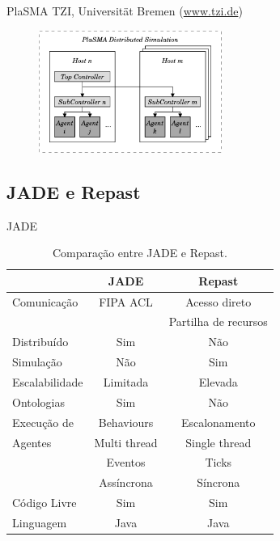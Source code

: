 \begin{frame}{PlaSMA}
	TZI, Universität Bremen (\url{www.tzi.de})

	\begin{figure}
		\centering
		\includegraphics[height=4cm]{figures/PlaSMA.pdf}
	\end{figure}
\end{frame}

\subsection{JADE e Repast}

\begin{frame}{JADE}
	\begin{table}[h]
		\label{tab:jadevsrep}
		\tiny
		\begin{center}
			\begin{tabular}{l|cc}
			\hline

			\hline
			\textbf{} & \textbf{JADE} & \textbf{Repast} \\ %
			\hline
				Comunicação & FIPA ACL &  Acesso direto  \\ %
							  &			 &  Partilha de recursos \\
			\hline
				Distribuído & Sim & Não \\ 
			\hline
				Simulação & Não & Sim \\ 
			\hline
				Escalabilidade & Limitada & Elevada \\ 
			\hline
				Ontologias & Sim & Não \\
			\hline
				Execução de & Behaviours 	& Escalonamento  	\\ %
				Agentes		& Multi thread 	& Single thread 	\\ %
							& Eventos   	& Ticks		 	   	\\ %
							& Assíncrona 	& Síncrona 		   	\\ %
			\hline
				Código Livre & Sim & Sim \\ 
			\hline
				Linguagem & Java & Java \\ 
			\hline
			\end{tabular}
		\end{center}
		\caption{Comparação entre JADE e Repast.}
	\end{table}
\end{frame}

